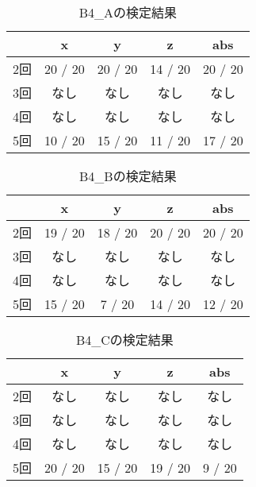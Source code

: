         \newpage
        \begin{table}[tb]
            \caption{B4_Aの検定結果}
            \vspace{0.5cm}
            \centering
            \begin{tabular}{|c|c|c|c|c|}
                \hline
                \diagbox{}{} & x & y & z & abs \\\hline
                2回 & 20 / 20 & 20 / 20 & 14 / 20 & 20 / 20 \\
                3回 & なし & なし & なし & なし \\
                4回 & なし & なし & なし & なし \\
                5回 & 10 / 20 & 15 / 20 & 11 / 20 & 17 / 20 \\
                \hline
            \end{tabular}
        \end{table}
        \begin{table}[tb]
            \caption{B4_Bの検定結果}
            \vspace{0.5cm}
            \centering
            \begin{tabular}{|c|c|c|c|c|}
                \hline
                \diagbox{}{} & x & y & z & abs \\\hline
                2回 & 19 / 20 & 18 / 20 & 20 / 20 & 20 / 20 \\
                3回 & なし & なし & なし & なし \\
                4回 & なし & なし & なし & なし \\
                5回 & 15 / 20 & 7 / 20 & 14 / 20 & 12 / 20 \\
                \hline
            \end{tabular}
        \end{table}
        \begin{table}[tb]
            \caption{B4_Cの検定結果}
            \vspace{0.5cm}
            \centering
            \begin{tabular}{|c|c|c|c|c|}
                \hline
                \diagbox{}{} & x & y & z & abs \\\hline
                2回 & なし & なし & なし & なし \\
                3回 & なし & なし & なし & なし \\
                4回 & なし & なし & なし & なし \\
                5回 & 20 / 20 & 15 / 20 & 19 / 20 & 9 / 20 \\
                \hline
            \end{tabular}
        \end{table}
